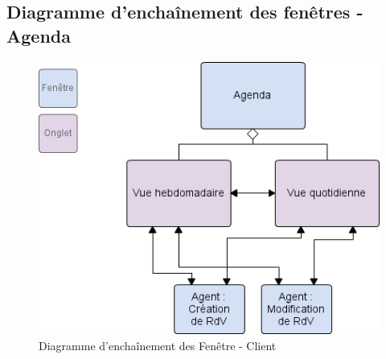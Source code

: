 \subsection{Diagramme d'enchaînement des fenêtres - Agenda} 

\begin{figure}[H]
	\begin{center}
		\includegraphics[scale=0.6]{EDF/Agenda.png}
		\caption{Diagramme d'enchaînement des Fenêtre - Client}
	\end{center}
\end{figure}
